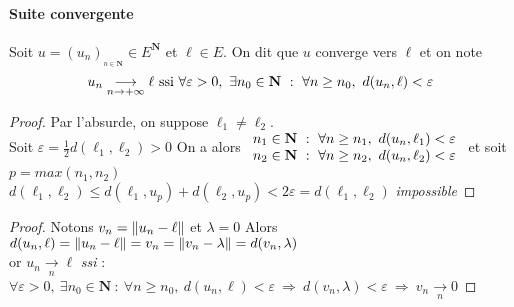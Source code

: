		\vspace{-15pt}
		\traitd 
		\paragraph{Suite convergente}	
			Soit $u=\left( u_n\right)_{_{n\in\mathbf{N}}} \in E^{\mathbf{N}}$ et $\ell\in E$.
			On dit que $u$ converge vers $\ell$ et on note 
			\[
				u_n \underset{n\rightarrow +\infty}{\longrightarrow} \ell ~\mathrm{ssi}~\forall 
				\varepsilon >0 ,~\exists n_0 \in \mathbf{N} ~:~ \forall n\geq n_0,~d(u_n ,\ell) <\varepsilon
			\vspace{-25pt}
			\] 
		\trait 
			
			
		\begin{proof}
			Par l'absurde, on suppose $\ell_1\neq \ell_2$.\\
			Soit $\varepsilon = \frac{1}{2} d(\ell_1,\ell_2) >0$
			On a alors $\begin{array}{l} n_1 \in \mathbf{N} ~:~\forall n\geq n_1 ,~d(u_n,\ell_1) < \varepsilon \\  
			n_2 \in \mathbf{N} ~:~\forall n\geq n_2 ,~d(u_n,\ell_2) < \varepsilon \end{array} $  et soit $p=max(n_1,n_2)$ \vspace*{0.1cm}\\
			$d(\ell_1,\ell_2) \leq d(\ell_1,u_p) + d(\ell_2,u_p) < 2\varepsilon = d(\ell_1,\ell_2)$  \emph{impossible}
		\end{proof} \medskip
		
		
		\begin{proof}
			Notons $v_n = \left\Vert u_n-\ell \right\Vert$ et $\lambda = 0$
			Alors $d(u_n,\ell) = \left\Vert u_n - \ell \right\Vert = v_n = \left\Vert v_n - \lambda \right\Vert = d(v_n,\lambda )$ \\
			or $u_n \underset{n}{\rightarrow} \ell$ \emph{ssi} : $\forall \varepsilon >0 ,~\exists n_0 \in \mathbf{N} ~:~ 
			\forall n\geq n_0,~d(u_n ,\ell) <\varepsilon ~\Rightarrow ~ d(v_n,\lambda)<\varepsilon ~\Rightarrow ~ v_n \underset{n}{\rightarrow} 0$
		\end{proof} \medskip

